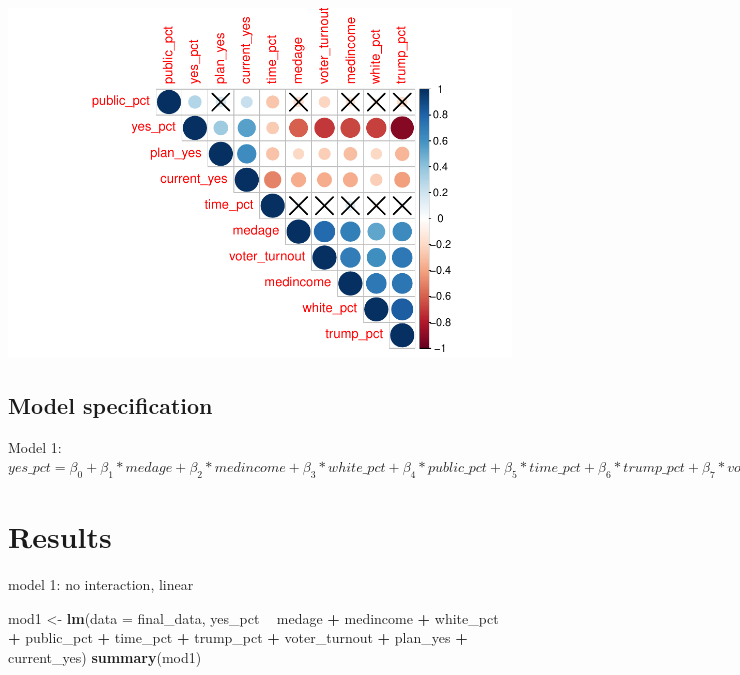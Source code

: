 \documentclass[
]{article}
\newenvironment{Shaded}{\begin{snugshade}}{\end{snugshade}}
\newcommand{\DataTypeTok}[1]{\textcolor[rgb]{0.13,0.29,0.53}{#1}}
\newcommand{\KeywordTok}[1]{\textcolor[rgb]{0.13,0.29,0.53}{\textbf{#1}}}
\newcommand{\NormalTok}[1]{#1}
\newcommand{\OperatorTok}[1]{\textcolor[rgb]{0.81,0.36,0.00}{\textbf{#1}}}
\newcommand{\StringTok}[1]{\textcolor[rgb]{0.31,0.60,0.02}{#1}}
\begin{document}
\includegraphics{Zhong_paper_files/figure-latex/unnamed-chunk-1-1.pdf}

\hypertarget{model-specification}{%
\subsection{Model specification}\label{model-specification}}

Model 1:
\(yes\_pct = \beta_0+\beta_1*medage+\beta_2*medincome+\beta_3*white\_pct+\beta_4*public\_pct+\beta_5*time\_pct+\beta_6*trump\_pct+\beta_7*voter\_turnout+\beta_8*plan\_yes+\beta_9*current\_yes+\epsilon\)

\hypertarget{results}{%
\section{Results}\label{results}}

model 1: no interaction, linear

\begin{Shaded}
\begin{Highlighting}[]
\NormalTok{mod1 <-}\StringTok{ }\KeywordTok{lm}\NormalTok{(}\DataTypeTok{data =}\NormalTok{ final_data, yes_pct }\OperatorTok{~}\StringTok{ }\NormalTok{medage }\OperatorTok{+}\StringTok{ }\NormalTok{medincome }\OperatorTok{+}\StringTok{ }\NormalTok{white_pct }
           \OperatorTok{+}\StringTok{ }\NormalTok{public_pct }\OperatorTok{+}\StringTok{ }\NormalTok{time_pct }\OperatorTok{+}\StringTok{ }\NormalTok{trump_pct }\OperatorTok{+}\StringTok{ }\NormalTok{voter_turnout }\OperatorTok{+}
\StringTok{              }\NormalTok{plan_yes }\OperatorTok{+}\StringTok{ }\NormalTok{current_yes)}
\KeywordTok{summary}\NormalTok{(mod1)}
\end{Highlighting}
\end{Shaded}
\end{document}
